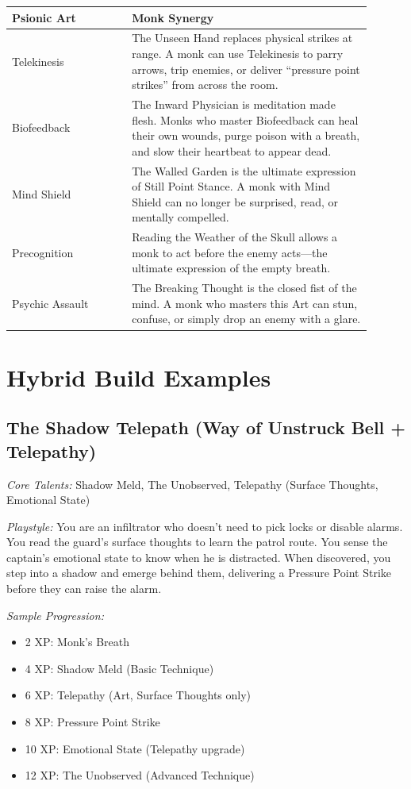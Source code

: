 \documentclass[11pt]{book}
\begin{document}
\begin{supertabular}{p{0.3\linewidth}p{0.6\linewidth}}
\hline \textbf{Psionic Art} & \textbf{Monk Synergy} \\ \hline
Telekinesis & The Unseen Hand replaces physical strikes at range. A monk can use Telekinesis to parry arrows, trip enemies, or deliver ``pressure point strikes'' from across the room. \\
Biofeedback & The Inward Physician is meditation made flesh. Monks who master Biofeedback can heal their own wounds, purge poison with a breath, and slow their heartbeat to appear dead. \\
Mind Shield & The Walled Garden is the ultimate expression of Still Point Stance. A monk with Mind Shield can no longer be surprised, read, or mentally compelled. \\
Precognition & Reading the Weather of the Skull allows a monk to act before the enemy acts---the ultimate expression of the empty breath. \\
Psychic Assault & The Breaking Thought is the closed fist of the mind. A monk who masters this Art can stun, confuse, or simply drop an enemy with a glare. \\
\end{supertabular}

\section{Hybrid Build Examples}

\subsection{The Shadow Telepath (Way of Unstruck Bell + Telepathy)}

\textit{Core Talents:} Shadow Meld, The Unobserved, Telepathy (Surface Thoughts, Emotional State)

\textit{Playstyle:} You are an infiltrator who doesn't need to pick locks or disable alarms. You read the guard's surface thoughts to learn the patrol route. You sense the captain's emotional state to know when he is distracted. When discovered, you step into a shadow and emerge behind them, delivering a Pressure Point Strike before they can raise the alarm.

\textit{Sample Progression:}
\begin{itemize}
    \item 2 XP: Monk's Breath
    \item 4 XP: Shadow Meld (Basic Technique)
    \item 6 XP: Telepathy (Art, Surface Thoughts only)
    \item 8 XP: Pressure Point Strike
    \item 10 XP: Emotional State (Telepathy upgrade)
    \item 12 XP: The Unobserved (Advanced Technique)
\end{itemize}
\end{document}
